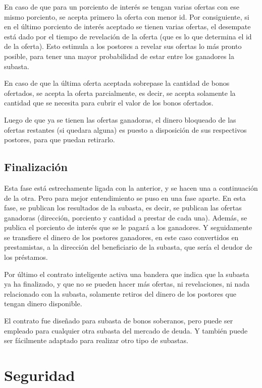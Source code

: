     En caso de que para un porciento de interés se tengan varias ofertas con ese mismo porciento, se acepta primero la oferta con menor 
    id. Por consiguiente, si en el último porciento de interés aceptado se tienen varias ofertas, el desempate está dado por el tiempo
    de revelación de la oferta (que es lo que determina el id de la oferta). Esto estimula a los postores a revelar sus ofertas lo más
    pronto posible, para tener una mayor probabilidad de estar entre los ganadores la subasta.

    En caso de que la última oferta aceptada sobrepase la cantidad de bonos ofertados, se acepta la oferta parcialmente, es decir, se
    acepta solamente la cantidad que se necesita para cubrir el valor de los bonos ofertados.

    Luego de que ya se tienen las ofertas ganadoras, el dinero bloqueado de las ofertas restantes (si quedara alguna) es puesto a 
    disposición de sus respectivos postores, para que puedan retirarlo.

    \subsection{Finalización}
    Esta fase está estrechamente ligada con la anterior, y se hacen una a continuación de la otra. Pero para mejor entendimiento se 
    puso en una fase aparte. En esta fase, se publican los resultados de la subasta, es decir, se publican las ofertas ganadoras
    (dirección, porciento y cantidad a prestar de cada una). Además, se publica el porciento de interés que se le pagará a los ganadores.
    Y seguidamente se transfiere el dinero de los postores ganadores, en este caso convertidos en prestamistas, a la dirección del 
    beneficiario de la subasta, que sería el deudor de los préstamos.

    Por último el contrato inteligente activa una bandera que indica que la subasta ya ha finalizado, y que no se pueden hacer más
    ofertas, ni revelaciones, ni nada relacionado con la subasta, solamente retiros del dinero de los postores que tengan dinero disponible.

    El contrato fue diseñado para subasta de bonos soberanos, pero puede ser empleado para cualquier otra subasta del mercado de deuda.
    Y también puede ser fácilmente adaptado para realizar otro tipo de subastas.

\section{Seguridad}
